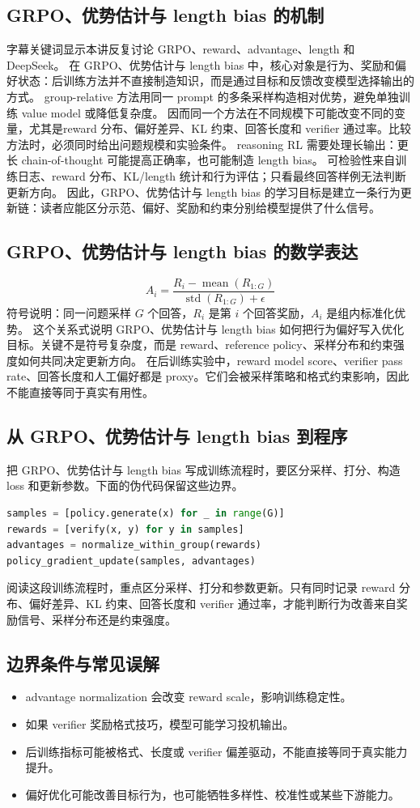 \documentclass[a4paper]{article}
\begin{document}
\subsection{GRPO、优势估计与 length bias 的机制}
字幕关键词显示本讲反复讨论 GRPO、reward、advantage、length 和 DeepSeek。 在 GRPO、优势估计与 length bias 中，核心对象是行为、奖励和偏好状态：后训练方法并不直接制造知识，而是通过目标和反馈改变模型选择输出的方式。
group-relative 方法用同一 prompt 的多条采样构造相对优势，避免单独训练 value model 或降低复杂度。 因而同一个方法在不同规模下可能改变不同的变量，尤其是reward 分布、偏好差异、KL 约束、回答长度和 verifier 通过率。比较方法时，必须同时给出问题规模和实验条件。
reasoning RL 需要处理长输出：更长 chain-of-thought 可能提高正确率，也可能制造 length bias。 可检验性来自训练日志、reward 分布、KL/length 统计和行为评估；只看最终回答样例无法判断更新方向。
因此，GRPO、优势估计与 length bias 的学习目标是建立一条行为更新链：读者应能区分示范、偏好、奖励和约束分别给模型提供了什么信号。
\subsection{GRPO、优势估计与 length bias 的数学表达}
\[A_i=\frac{R_i-\operatorname{mean}(R_{1:G})}{\operatorname{std}(R_{1:G})+\epsilon}\]
符号说明：同一问题采样 \(G\) 个回答，\(R_i\) 是第 \(i\) 个回答奖励，\(A_i\) 是组内标准化优势。
这个关系式说明 GRPO、优势估计与 length bias 如何把行为偏好写入优化目标。关键不是符号复杂度，而是 reward、reference policy、采样分布和约束强度如何共同决定更新方向。
在后训练实验中，reward model score、verifier pass rate、回答长度和人工偏好都是 proxy。它们会被采样策略和格式约束影响，因此不能直接等同于真实有用性。
\subsection{从 GRPO、优势估计与 length bias 到程序}
把 GRPO、优势估计与 length bias 写成训练流程时，要区分采样、打分、构造 loss 和更新参数。下面的伪代码保留这些边界。
\begin{lstlisting}[language=Python]
samples = [policy.generate(x) for _ in range(G)]
rewards = [verify(x, y) for y in samples]
advantages = normalize_within_group(rewards)
policy_gradient_update(samples, advantages)
\end{lstlisting}
阅读这段训练流程时，重点区分采样、打分和参数更新。只有同时记录 reward 分布、偏好差异、KL 约束、回答长度和 verifier 通过率，才能判断行为改善来自奖励信号、采样分布还是约束强度。
\subsection{边界条件与常见误解}
\begin{itemize}
\item advantage normalization 会改变 reward scale，影响训练稳定性。
\item 如果 verifier 奖励格式技巧，模型可能学习投机输出。
\item 后训练指标可能被格式、长度或 verifier 偏差驱动，不能直接等同于真实能力提升。
\item 偏好优化可能改善目标行为，也可能牺牲多样性、校准性或某些下游能力。
\end{itemize}
\end{document}
